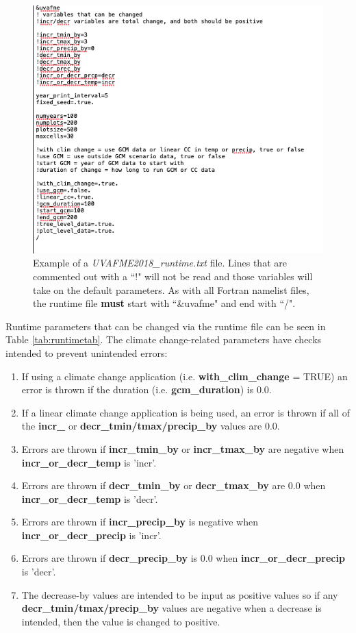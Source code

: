 \documentclass[a4paper, 12pt] {article}
\begin{document}
\begin{figure}
  \includegraphics[width=0.6\linewidth]{manual_figures/UVAFME_Runtime.png}
  \caption{Example of a \textit{UVAFME2018\_runtime.txt} file. Lines that are commented out with a ``!" will not be read and those variables will take on the default parameters. As with all Fortran namelist files, the runtime file \textbf{must} start with ``\&uvafme" and end with ``/".}
  \label{fig:runtime}
\end{figure}

Runtime parameters that can be changed via the runtime file can be seen in Table \ref{tab:runtimetab}. The climate change-related parameters have checks intended to prevent unintended errors:
\begin{enumerate}
\item If using a climate change application (i.e. \textbf{with\_clim\_change} = TRUE) an error is thrown if the duration (i.e. \textbf{gcm\_duration}) is 0.0. 
\item If a linear climate change application is being used, an error is thrown if all of the \textbf{incr\_ } or \textbf{decr\_tmin/tmax/precip\_by} values are 0.0. 
\item Errors are thrown if \textbf{incr\_tmin\_by} or \textbf{incr\_tmax\_by} are negative when \textbf{incr\_or\_decr\_temp} is 'incr'.
\item Errors are thrown if \textbf{decr\_tmin\_by} or \textbf{decr\_tmax\_by} are 0.0 when \textbf{incr\_or\_decr\_temp} is 'decr'.
\item Errors are thrown if \textbf{incr\_precip\_by} is negative when \textbf{incr\_or\_decr\_precip} is 'incr'.
\item Errors are thrown if \textbf{decr\_precip\_by} is 0.0 when \textbf{incr\_or\_decr\_precip} is 'decr'.
\item The decrease-by values are intended to be input as positive values so if any \textbf{decr\_tmin/tmax/precip\_by} values are negative when a decrease is intended, then the value is changed to positive.
\end{enumerate}
\end{document}
